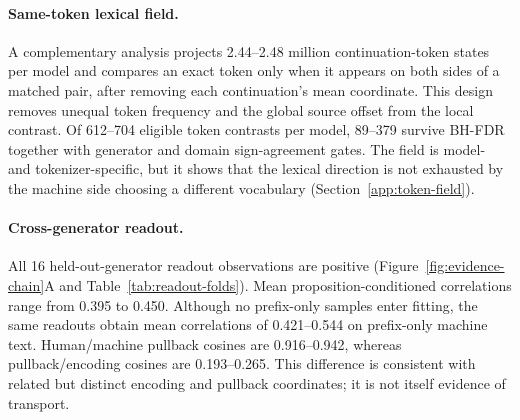 \paragraph{Same-token lexical field.} A complementary analysis projects 2.44--2.48 million continuation-token states per model and compares an exact token only when it appears on both sides of a matched pair, after removing each continuation's mean coordinate. This design removes unequal token frequency and the global source offset from the local contrast. Of 612--704 eligible token contrasts per model, 89--379 survive BH-FDR together with generator and domain sign-agreement gates. The field is model- and tokenizer-specific, but it shows that the lexical direction is not exhausted by the machine side choosing a different vocabulary (Section~\ref{app:token-field}).

\paragraph{Cross-generator readout.} All 16 held-out-generator readout observations are positive (Figure~\ref{fig:evidence-chain}A and Table~\ref{tab:readout-folds}). Mean proposition-conditioned correlations range from 0.395 to 0.450. Although no prefix-only samples enter fitting, the same readouts obtain mean correlations of 0.421--0.544 on prefix-only machine text. Human/machine pullback cosines are 0.916--0.942, whereas pullback/encoding cosines are 0.193--0.265. This difference is consistent with related but distinct encoding and pullback coordinates; it is not itself evidence of transport.

